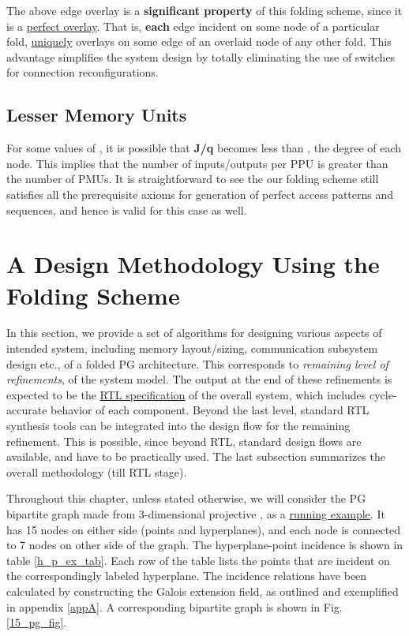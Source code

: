 \documentclass[12pt]{article}
\begin{document}
The above edge overlay is a \textbf{significant property} of this
folding scheme, since it is a \uline{perfect overlay}. That is,
\textbf{each} edge incident on some node of a particular fold,
\uline{uniquely} overlays on some edge of an overlaid node of any other
fold. This advantage simplifies the system design by totally eliminating the
use of switches for connection reconfigurations.

\subsection{Lesser Memory Units}
For some values of , it is possible that \textbf{J/q} becomes
less than , the degree of each node. This implies that the number
of inputs/outputs per PPU is greater than the number of PMUs. It is straightforward to see the our folding scheme still satisfies
all the prerequisite axioms for generation of perfect access patterns and
sequences, and hence is valid for this case as well.

\section{A Design Methodology Using the Folding Scheme}
\label{methodology_sec}
In this section, we provide a set of algorithms for designing various aspects of intended system,
including memory layout/sizing, communication subsystem design etc., of a folded PG architecture.
This corresponds to \textit{remaining level of refinements}, of the
system model. The output at the end of these refinements is
expected to be the \uline{RTL specification} of the overall
system, which includes cycle-accurate behavior of each component.
Beyond the last level, standard RTL synthesis tools can be integrated
into the design flow for the remaining refinement. This is possible, since
beyond RTL, standard design flows are available, and have to be practically
used. The last subsection summarizes the overall methodology (till RTL stage).

Throughout this chapter, unless stated otherwise, we will consider the PG bipartite graph
made from 3-dimensional projective , as a
\uline{running example}. It has 15 nodes on either side (points
and hyperplanes), and each node is connected to 7 nodes on other side of
the graph. The hyperplane-point incidence is shown in table
\ref{h_p_ex_tab}. Each row of the table lists the points that are
incident on the correspondingly labeled hyperplane. The incidence relations
have been calculated by constructing the Galois extension field, as
outlined and exemplified in appendix \ref{appA}. A corresponding
bipartite graph is shown in Fig. \ref{15_pg_fig}.
\end{document}
